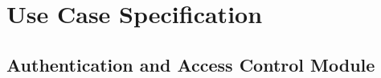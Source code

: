 \section{Use Case Specification}
\label{appendix:usecase-specifications}

\begingroup
\small

\subsection{Authentication and Access Control Module}

